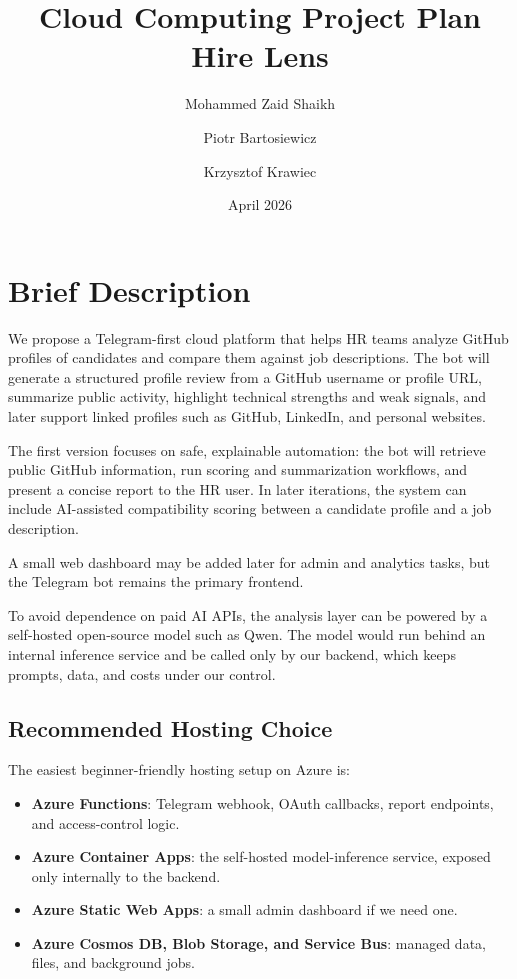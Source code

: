 \documentclass[11pt]{article}
\title{Cloud Computing Project Plan\\\large Hire Lens}
\author{Mohammed Zaid Shaikh \and Piotr Bartosiewicz \and Krzysztof Krawiec}
\date{April 2026}
\begin{document}
\maketitle
\tableofcontents
\newpage

\section{Brief Description}
We propose a Telegram-first cloud platform that helps HR teams analyze GitHub profiles of candidates and compare them against job descriptions. The bot will generate a structured profile review from a GitHub username or profile URL, summarize public activity, highlight technical strengths and weak signals, and later support linked profiles such as GitHub, LinkedIn, and personal websites.

The first version focuses on safe, explainable automation: the bot will retrieve public GitHub information, run scoring and summarization workflows, and present a concise report to the HR user. In later iterations, the system can include AI-assisted compatibility scoring between a candidate profile and a job description.

A small web dashboard may be added later for admin and analytics tasks, but the Telegram bot remains the primary frontend.

To avoid dependence on paid AI APIs, the analysis layer can be powered by a self-hosted open-source model such as Qwen. The model would run behind an internal inference service and be called only by our backend, which keeps prompts, data, and costs under our control.

\subsection{Recommended Hosting Choice}
The easiest beginner-friendly hosting setup on Azure is:
\begin{itemize}[leftmargin=*]
  \item \textbf{Azure Functions}: Telegram webhook, OAuth callbacks, report endpoints, and access-control logic.
  \item \textbf{Azure Container Apps}: the self-hosted model-inference service, exposed only internally to the backend.
  \item \textbf{Azure Static Web Apps}: a small admin dashboard if we need one.
  \item \textbf{Azure Cosmos DB, Blob Storage, and Service Bus}: managed data, files, and background jobs.
\end{itemize}
\end{document}
